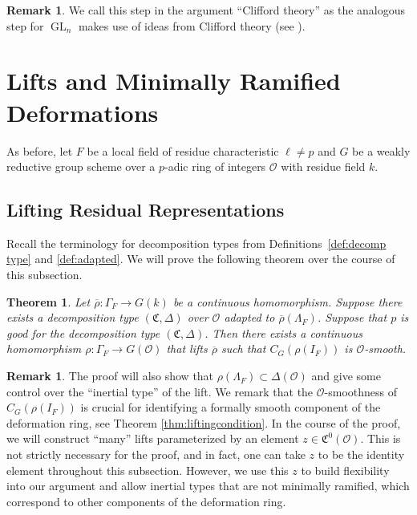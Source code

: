 \documentclass[11pt, letterpaper,english]{amsart}
\theoremstyle{plain}
\newtheorem{theorem}[lem]{Theorem}
\theoremstyle{definition}
\newtheorem{remark}[lem]{Remark}
\numberwithin{equation}{section}
\numberwithin{lem}{section}
\newcommand{\fC}{\mathfrak{C}}
\newcommand{\cO}{\mathcal{O}}
\newcommand{\rhobar}{{\overline{\rho}}}
\DeclareMathOperator{\GL}{GL}
\newcommand{\cent}[2]{C_{#1}(#2)}
\begin{document}
\begin{remark}
We call this step in the argument ``Clifford theory'' as the analogous step for $\GL_n$ \cite[Lemma 2.4.11]{cht08} makes use of ideas from Clifford theory (see \cite[\S11]{CR81}).
\end{remark}







\section{Lifts and Minimally Ramified Deformations} \label{sec:liftingsmr}

As before, let $F$ be a local field of residue characteristic $\ell \neq p$ and $G$ be a weakly reductive group scheme over a $p$-adic ring of integers $\cO$ with residue field $k$.  

\subsection{Lifting Residual Representations} \label{ss:lifting}

Recall the terminology for decomposition types from Definitions~\ref{def:decomp type} and \ref{def:adapted}.  We will prove the following theorem over the course of this subsection.

\begin{theorem} \label{thm:liftingfixed}
Let $\rhobar : \Gamma_F \to G(k)$ be a continuous homomorphism.  Suppose there exists a decomposition type $(\fC,\Delta)$ over $\cO$ adapted to $\rhobar(\Lambda_F)$.  Suppose that $p$ is good for the decomposition type $(\fC,\Delta)$.
Then there exists a continuous homomorphism $\rho : \Gamma_F \to G(\cO)$ that lifts $\rhobar$ such that $\cent{G}{\rho(I_F)}$ is $\cO$-smooth. %
\end{theorem}

\begin{remark} \label{remark:extraconditions}
The proof will also show that $\rho(\Lambda_F) \subset \Delta(\cO)$ and give some control over the ``inertial type'' of the lift. We remark that the $\cO$-smoothness of $\cent{G}{\rho(I_F)}$ is crucial for identifying a formally smooth component of the deformation ring, see Theorem \ref{thm:liftingcondition}. In the course of the proof, we will construct ``many'' lifts parameterized by an element $z \in \fC^0(\cO)$. This is not strictly necessary for the proof, and in fact, one can take $z$ to be the identity element throughout this subsection. However, we use this $z$ to build flexibility into our argument and allow inertial types that are not minimally ramified, which correspond to other components of the deformation ring. 
\end{remark}
\end{document}
